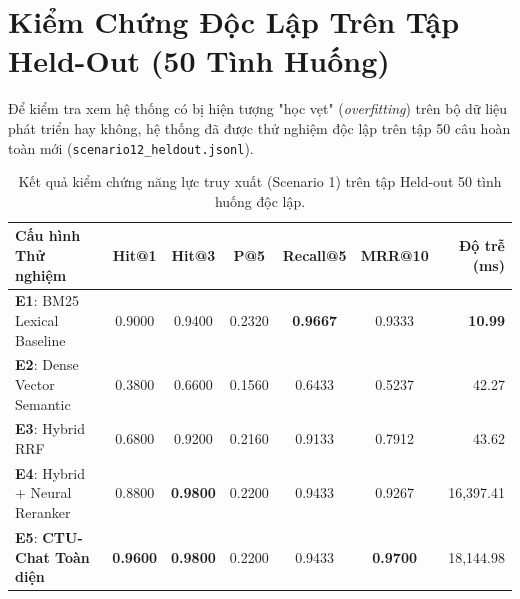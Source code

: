 \documentclass[a4paper,10pt]{article}
\begin{document}
\section{Kiểm Chứng Độc Lập Trên Tập Held-Out (50 Tình Huống)}

Để kiểm tra xem hệ thống có bị hiện tượng "học vẹt" (\textit{overfitting}) trên bộ dữ liệu phát triển hay không, hệ thống đã được thử nghiệm độc lập trên tập 50 câu hoàn toàn mới (\texttt{scenario12\_heldout.jsonl}).

\begin{table}[h!]
\centering
\small
\renewcommand{\arraystretch}{1.2}
\begin{tabularx}{\textwidth}{X c c c c c r}
\toprule
\rowcolor{tableheader}
\textbf{Cấu hình Thử nghiệm} & \textbf{Hit@1} & \textbf{Hit@3} & \textbf{P@5} & \textbf{Recall@5} & \textbf{MRR@10} & \textbf{Độ trễ (ms)} \\
\midrule
\textbf{E1}: BM25 Lexical Baseline & 0.9000 & 0.9400 & 0.2320 & \textbf{0.9667} & 0.9333 & \textbf{10.99} \\
\textbf{E2}: Dense Vector Semantic & 0.3800 & 0.6600 & 0.1560 & 0.6433 & 0.5237 & 42.27 \\
\textbf{E3}: Hybrid RRF & 0.6800 & 0.9200 & 0.2160 & 0.9133 & 0.7912 & 43.62 \\
\textbf{E4}: Hybrid + Neural Reranker & 0.8800 & \textbf{0.9800} & 0.2200 & 0.9433 & 0.9267 & 16,397.41 \\
\rowcolor{successbg}
\textbf{E5}: \textbf{CTU-Chat Toàn diện} & \textbf{0.9600} & \textbf{0.9800} & 0.2200 & 0.9433 & \textbf{0.9700} & 18,144.98 \\
\bottomrule
\end{tabularx}
\caption{Kết quả kiểm chứng năng lực truy xuất (Scenario 1) trên tập Held-out 50 tình huống độc lập.}
\label{tab:heldout_scen1}
\end{table}
\end{document}
